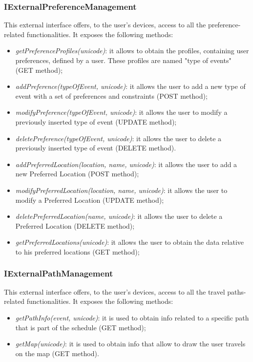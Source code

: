 \subsubsection{IExternalPreferenceManagement}
This external interface offers, to the user's devices, access to all the preference-related functionalities. It exposes the following methods:
\begin{itemize}
\item \textit{getPreferenceProfiles(unicode)}: it allows to obtain the profiles, containing user preferences, defined by a user. These profiles are named "type of events" (GET method);
\item \textit{addPreference(typeOfEvent, unicode)}: it allows the user to add a new type of event with a set of preferences and constraints (POST method);
\item \textit{modifyPreference(typeOfEvent, unicode)}: it allows the user to modify a previously inserted type of event (UPDATE method);
\item \textit{deletePreference(typeOfEvent, unicode)}: it allows the user to delete a previously inserted type of event (DELETE method).
\item \textit{addPreferredLocation(location, name, unicode)}: it allows the user to add a new Preferred Location (POST method);
\item \textit{modifyPreferredLocation(location, name, unicode)}: it allows the user to modify a Preferred Location (UPDATE method);
\item \textit{deletePreferredLocation(name, unicode)}: it allows the user to delete a Preferred Location (DELETE method);
\item \textit{getPreferredLocations(unicode)}: it allows the user to obtain the data relative to his preferred locations (GET method);
\end{itemize}
\subsubsection{IExternalPathManagement}
This external interface offers, to the user's devices, access to all the travel paths-related functionalities. It exposes the following methods:
\begin{itemize}
\item \textit{getPathInfo(event, unicode)}: it is used to obtain info related to a specific path that is part of the schedule (GET method);
\item \textit{getMap(unicode)}: it is used to obtain info that allow to draw the user travels on the map (GET method).
\end{itemize}

